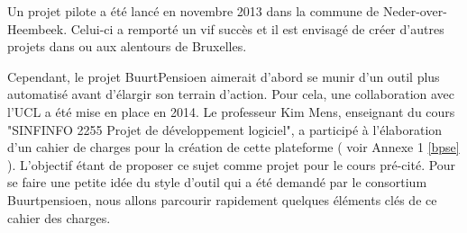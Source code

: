 Un projet pilote a été lancé en novembre 2013 dans la commune de Neder-over-Heembeek.  Celui-ci a remporté un vif succès et il est envisagé de créer d'autres projets dans ou aux alentours de Bruxelles.  

Cependant,  le projet BuurtPensioen aimerait d'abord se munir d'un outil plus automatisé avant d'élargir son terrain d'action.  Pour cela,  une collaboration avec l'UCL a été mise en place en 2014.  Le professeur Kim Mens,  enseignant du cours "SINFINFO 2255 Projet de développement logiciel",  a participé à l'élaboration d'un cahier de charges pour la création de cette plateforme ( voir Annexe 1 \ref{bpse} ).  L'objectif étant de proposer ce sujet comme projet pour le cours pré-cité.  
\newline
\newline
Pour se faire une petite idée du style d'outil qui a été demandé par le consortium Buurtpensioen,  nous allons parcourir rapidement quelques éléments clés de ce cahier des charges.

